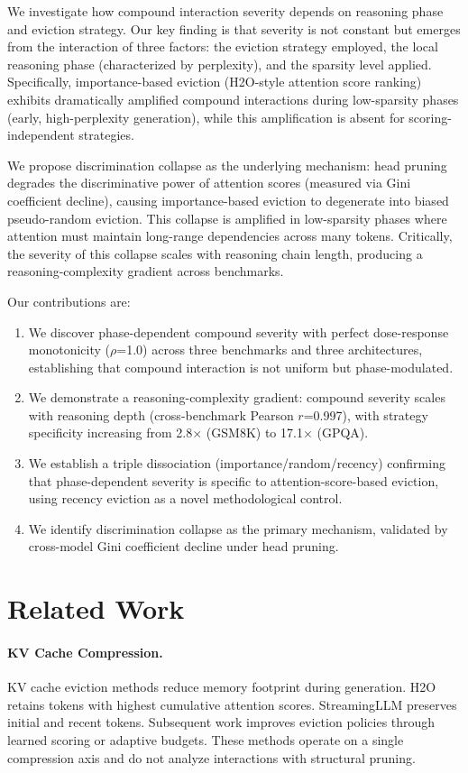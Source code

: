 \documentclass[11pt,a4paper]{article}
\begin{document}
We investigate how compound interaction severity depends on reasoning phase and eviction strategy. Our key finding is that severity is not constant but emerges from the interaction of three factors: the eviction strategy employed, the local reasoning phase (characterized by perplexity), and the sparsity level applied. Specifically, importance-based eviction (H2O-style attention score ranking) exhibits dramatically amplified compound interactions during low-sparsity phases (early, high-perplexity generation), while this amplification is absent for scoring-independent strategies.

We propose discrimination collapse as the underlying mechanism: head pruning degrades the discriminative power of attention scores (measured via Gini coefficient decline), causing importance-based eviction to degenerate into biased pseudo-random eviction. This collapse is amplified in low-sparsity phases where attention must maintain long-range dependencies across many tokens. Critically, the severity of this collapse scales with reasoning chain length, producing a reasoning-complexity gradient across benchmarks.

Our contributions are:
\begin{enumerate}
\item We discover phase-dependent compound severity with perfect dose-response monotonicity ($\rho$=1.0) across three benchmarks and three architectures, establishing that compound interaction is not uniform but phase-modulated.
\item We demonstrate a reasoning-complexity gradient: compound severity scales with reasoning depth (cross-benchmark Pearson $r$=0.997), with strategy specificity increasing from 2.8$\times$ (GSM8K) to 17.1$\times$ (GPQA).
\item We establish a triple dissociation (importance/random/recency) confirming that phase-dependent severity is specific to attention-score-based eviction, using recency eviction as a novel methodological control.
\item We identify discrimination collapse as the primary mechanism, validated by cross-model Gini coefficient decline under head pruning.
\end{enumerate}

\section{Related Work}

\paragraph{KV Cache Compression.}
KV cache eviction methods reduce memory footprint during generation. H2O \citep{zhang2023h2o} retains tokens with highest cumulative attention scores. StreamingLLM \citep{xiao2024streamingllm} preserves initial and recent tokens. Subsequent work improves eviction policies through learned scoring or adaptive budgets. These methods operate on a single compression axis and do not analyze interactions with structural pruning.
\end{document}
